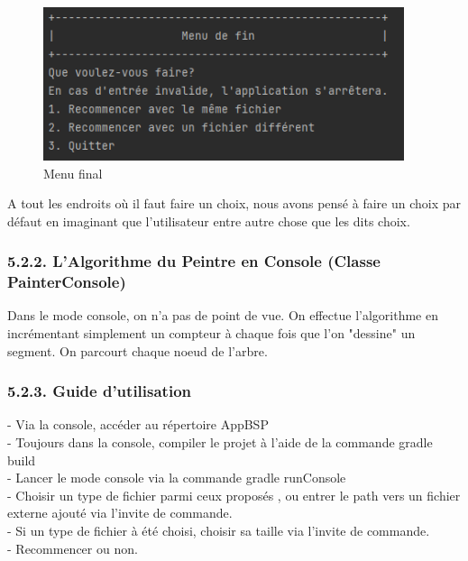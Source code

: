 \documentclass[a4paper,12pt]{report}	%
\begin{document}
\begin{figure}[H]
\begin{center}
  \includegraphics[width=400px]{end.png}
  \caption{Menu final}\label{fig:PERT}
\end{center}
\end{figure}
\indent A tout les endroits où il faut faire un choix, nous avons pensé à faire un choix par défaut en imaginant que l'utilisateur entre autre chose que les dits choix.\\

    {\subsubsection*{5.2.2. L'Algorithme du Peintre en Console (Classe PainterConsole)}}
    Dans le mode console, on n'a pas de point de vue. On effectue l'algorithme en incrémentant simplement un compteur à chaque fois que l'on "dessine" un segment. On parcourt chaque noeud de l'arbre.\\
	
    {\subsubsection*{5.2.3. Guide d'utilisation}}
	    - Via la console, accéder au répertoire AppBSP\\
\indent - Toujours dans la console, compiler le projet à l'aide de la commande gradle build \\
\indent - Lancer le mode console via la commande gradle runConsole\\
\indent - Choisir un type de fichier parmi ceux proposés , ou entrer le path vers un fichier externe ajouté via l'invite de commande.\\
\indent - Si un type de fichier à été choisi, choisir sa taille via l'invite de commande.\\
\indent - Recommencer ou non.\\
	
\end{document}
